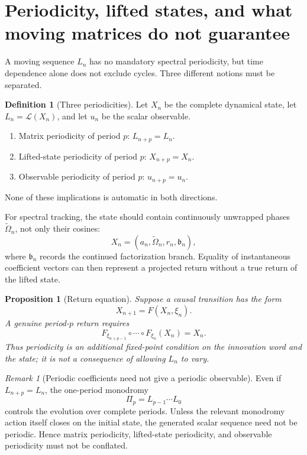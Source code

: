 \documentclass[11pt]{amsart}
\numberwithin{equation}{section}
\theoremstyle{plain}
\newtheorem{proposition}[theorem]{Proposition}
\theoremstyle{definition}
\newtheorem{definition}[theorem]{Definition}
\theoremstyle{remark}
\newtheorem{remark}[theorem]{Remark}
\begin{document}
\section{Periodicity, lifted states, and what moving matrices do not guarantee}
\label{sec:lifted_periodicity}

A moving sequence $L_n$ has no mandatory spectral periodicity, but time dependence alone does not
exclude cycles.  Three different notions must be separated.

\begin{definition}[Three periodicities]
\label{def:three_periodicities}
Let $X_n$ be the complete dynamical state, let $L_n=\mathcal L(X_n)$, and let $u_n$ be the scalar
observable.
\begin{enumerate}
\item Matrix periodicity of period $p$: $L_{n+p}=L_n$.
\item Lifted-state periodicity of period $p$: $X_{n+p}=X_n$.
\item Observable periodicity of period $p$: $u_{n+p}=u_n$.
\end{enumerate}
None of these implications is automatic in both directions.
\end{definition}

For spectral tracking, the state should contain continuously unwrapped phases
$\widetilde\Omega_n$, not only their cosines:
\begin{equation}
X_n=
\left(
a_n,\widetilde\Omega_n,r_n,\mathfrak b_n
\right),
\label{eq:lifted_state}
\end{equation}
where $\mathfrak b_n$ records the continued factorization branch.  Equality of instantaneous
coefficient vectors can then represent a projected return without a true return of the lifted
state.

\begin{proposition}[Return equation]
\label{prop:return_equation}
Suppose a causal transition has the form
\[
X_{n+1}=F(X_n,\xi_n).
\]
A genuine period-$p$ return requires
\begin{equation}
F_{\xi_{n+p-1}}\circ\cdots\circ F_{\xi_n}(X_n)=X_n.
\label{eq:p_step_return}
\end{equation}
Thus periodicity is an additional fixed-point condition on the innovation word and the state; it
is not a consequence of allowing $L_n$ to vary.
\end{proposition}

\begin{remark}[Periodic coefficients need not give a periodic observable]
\label{rem:periodic_coeff_not_signal}
Even if $L_{n+p}=L_n$, the one-period monodromy
\[
\Pi_p=L_{p-1}\cdots L_0
\]
controls the evolution over complete periods.  Unless the relevant monodromy action itself closes
on the initial state, the generated scalar sequence need not be periodic.  Hence matrix
periodicity, lifted-state periodicity, and observable periodicity must not be conflated.
\end{remark}
\end{document}
